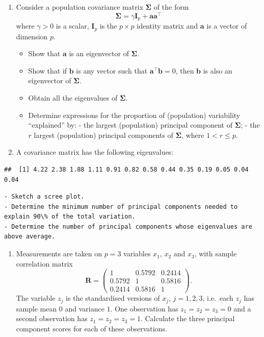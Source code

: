 \documentclass[]{book}
\providecommand{\tightlist}{%
  \setlength{\itemsep}{0pt}\setlength{\parskip}{0pt}}
\theoremstyle{definition}
\theoremstyle{definition}
\theoremstyle{definition}
\theoremstyle{remark}
\begin{document}
\begin{enumerate}
\def\labelenumi{\arabic{enumi}.}
\setcounter{enumi}{1}
\tightlist
\item
  Consider a population covariance matrix \(\boldsymbol \Sigma\) of the form
  \[\boldsymbol \Sigma=\gamma \mathbf I_p + \boldsymbol a\boldsymbol a^\top\]
  where \(\gamma>0\) is a scalar, \(\mathbf I_p\) is the \(p \times p\) identity matrix and \(\boldsymbol a\) is a vector of dimension \(p\).

  \begin{itemize}
  \tightlist
  \item
    Show that \(\boldsymbol a\) is an eigenvector of \(\boldsymbol \Sigma\).
  \item
    Show that if \(\boldsymbol b\) is any vector such that \(\boldsymbol a^\top \boldsymbol b=0\), then \(\boldsymbol b\) is also an eigenvector of \(\boldsymbol \Sigma\).
  \item
    Obtain all the eigenvalues of \(\boldsymbol \Sigma\).
  \item
    Determine expressions for the proportion of (population) variability ``explained'' by:
    - the largest (population) principal component of \(\boldsymbol \Sigma\);
    - the \(r\) largest (population) principal components of \(\boldsymbol \Sigma\), where \(1 < r \leq p\).
  \end{itemize}
\item
  A covariance matrix has the following eigenvalues:
\end{enumerate}

\begin{verbatim}
##  [1] 4.22 2.38 1.88 1.11 0.91 0.82 0.58 0.44 0.35 0.19 0.05 0.04 0.04
\end{verbatim}

\begin{verbatim}
- Sketch a scree plot.
- Determine the minimum number of principal components needed to explain 90\% of the total variation.
- Determine the number of principal components whose eigenvalues are above average.
\end{verbatim}

\begin{enumerate}
\def\labelenumi{\arabic{enumi}.}
\setcounter{enumi}{3}
\tightlist
\item
  Measurements are taken on \(p=3\) variables \(x_1\), \(x_2\) and \(x_3\), with sample correlation matrix
  \[
   \boldsymbol R= \begin{pmatrix} 1 & 0.5792 & 0.2414 \\ 0.5792 & 1 & 0.5816 \\ 0.2414 & 0.5816 & 1 \end{pmatrix}.
  \]
  The variable \(z_j\) is the standardised versions of \(x_j\), \(j=1,2,3\), i.e.~each \(z_j\) has sample mean \(0\) and variance \(1\).
  One observation has \(z_1 = z_2 = z_3 = 0\) and a second observation has \(z_1 = z_2 = z_3 =1\). Calculate the three
  principal component scores for
  each of these observations.
\end{enumerate}
\end{document}
